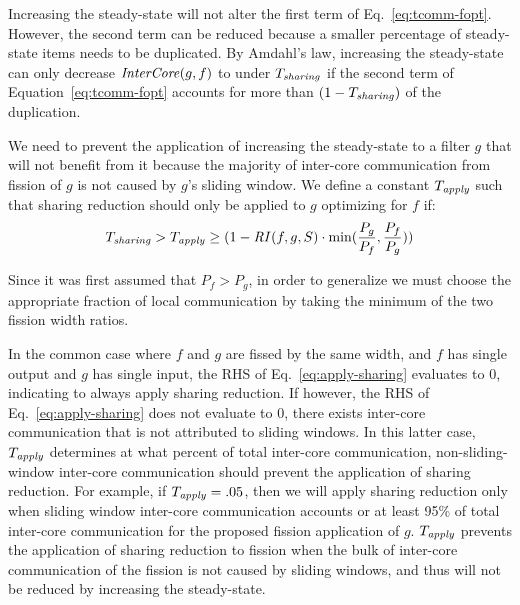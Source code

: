Increasing the steady-state will not alter the first term of
Eq.~\ref{eq:tcomm-fopt}.  However, the second term can be reduced
because a smaller percentage of steady-state items needs to be
duplicated.  By Amdahl's law, increasing the steady-state can only
decrease $\relax{\it InterCore}(g, f)$ to under $T_{\relax{\it sharing}}$ if the
second term of Equation~\ref{eq:tcomm-fopt} accounts for more than
$(1-T_{\relax{\it sharing}} )$ of the duplication.  

We need to prevent the application of increasing the steady-state to a
filter $g$ that will not benefit from it because the majority of
inter-core communication from fission of $g$ is not caused by $g$'s
sliding window.  We define a constant $T_{\relax{\it apply}}$ such that
sharing reduction should only be applied to $g$ optimizing for $f$ if:
{\ninepoint
\begin{equation}
\label{eq:apply-sharing}
T_{\mt{sharing}}  >  T_{\mt{apply}} \ge (1 -\mt{RI}(f,g, S) \cdot
\min(\frac{P_g}{P_f}, \frac{P_f}{P_g}))
\end{equation}
}

\noindent Since it was first assumed that $P_f > P_g$, in order to
generalize we must choose the appropriate fraction of local
communication by taking the minimum of the two fission width ratios.

In the common case where $f$ and $g$ are fissed by the same width, and
$f$ has single output and $g$ has single input, the RHS of
Eq.~\ref{eq:apply-sharing} evaluates to 0, indicating to always apply
sharing reduction.  If however, the RHS of Eq.~\ref{eq:apply-sharing}
does not evaluate to 0, there exists inter-core communication that is
not attributed to sliding windows.  In this latter case,
$T_{\relax{\it apply}}$ determines at what percent of total inter-core
communication, non-sliding-window inter-core communication should
prevent the application of sharing reduction.  For example, if
$T_{\relax{\it apply}} = .05$, then we will apply sharing reduction only when
sliding window inter-core communication accounts or at least 95\% of
total inter-core communication for the proposed fission application of
$g$. $T_{\relax{\it apply}}$ prevents the application of sharing reduction to
fission when the bulk of inter-core communication of the fission is
not caused by sliding windows, and thus will not be reduced by
increasing the steady-state.

